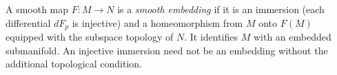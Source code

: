 
A smooth map $F:M\to N$ is a \emph{smooth embedding} if it is an immersion (each differential $dF_p$ is injective) and a homeomorphism from $M$ onto $F(M)$ equipped with the subspace topology of $N$. It identifies $M$ with an embedded submanifold. An injective immersion need not be an embedding without the additional topological condition.
